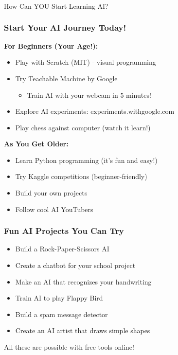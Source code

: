 \begin{frame}[fragile]\frametitle{}
\begin{center}
{\Large How Can YOU Start Learning AI?}
\end{center}
\end{frame}

\begin{frame}[fragile]\frametitle{Start Your AI Journey Today!}

{\bf For Beginners (Your Age!):}
\begin{itemize}
\item Play with Scratch (MIT) - visual programming
\item Try Teachable Machine by Google
\begin{itemize}
\item Train AI with your webcam in 5 minutes!
\end{itemize}
\item Explore AI experiments: experiments.withgoogle.com
\item Play chess against computer (watch it learn!)
\end{itemize}

{\bf As You Get Older:}
\begin{itemize}
\item Learn Python programming (it's fun and easy!)
\item Try Kaggle competitions (beginner-friendly)
\item Build your own projects
\item Follow cool AI YouTubers
\end{itemize}
\end{frame}

\begin{frame}[fragile]\frametitle{Fun AI Projects You Can Try}
\begin{itemize}
\item Build a Rock-Paper-Scissors AI
\item Create a chatbot for your school project
\item Make an AI that recognizes your handwriting
\item Train AI to play Flappy Bird
\item Build a spam message detector
\item Create an AI artist that draws simple shapes
\end{itemize}

\vspace{0.5cm}
All these are possible with free tools online!
\end{frame}

